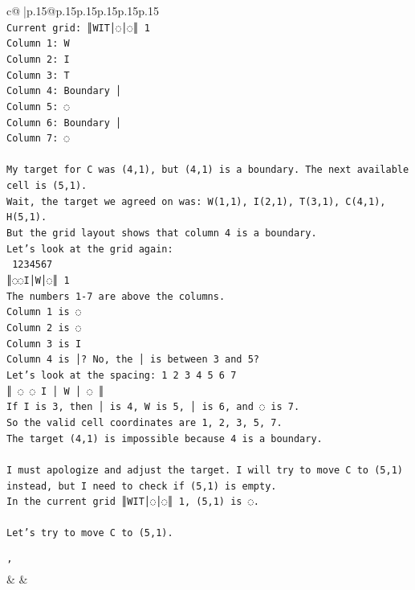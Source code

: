 \documentclass{article}
\begin{document}
{\begin{supertabular}{c@{$\;$}|p{.15\linewidth}@{}p{.15\linewidth}p{.15\linewidth}p{.15\linewidth}p{.15\linewidth}p{.15\linewidth}}
{{{\\ 
\texttt{Current grid: ║WIT│◌│◌║ 1} \\
\texttt{Column 1: W} \\
\texttt{Column 2: I} \\
\texttt{Column 3: T} \\
\texttt{Column 4: Boundary │} \\
\texttt{Column 5: ◌} \\
\texttt{Column 6: Boundary │} \\
\texttt{Column 7: ◌} \\
\\ 
\texttt{My target for C was (4,1), but (4,1) is a boundary. The next available cell is (5,1).} \\
\texttt{Wait, the target we agreed on was: W(1,1), I(2,1), T(3,1), C(4,1), H(5,1).} \\
\texttt{But the grid layout shows that column 4 is a boundary.} \\
\texttt{Let's look at the grid again:} \\
\texttt{ 1234567} \\
\texttt{║◌◌I│W│◌║ 1} \\
\texttt{The numbers 1{-}7 are above the columns.} \\
\texttt{Column 1 is ◌} \\
\texttt{Column 2 is ◌} \\
\texttt{Column 3 is I} \\
\texttt{Column 4 is │? No, the │ is between 3 and 5?} \\
\texttt{Let's look at the spacing: 1 2 3 4 5 6 7} \\
\texttt{║ ◌ ◌ I │ W │ ◌ ║} \\
\texttt{If I is 3, then │ is 4, W is 5, │ is 6, and ◌ is 7.} \\
\texttt{So the valid cell coordinates are 1, 2, 3, 5, 7.} \\
\texttt{The target (4,1) is impossible because 4 is a boundary.} \\
\\ 
\texttt{I must apologize and adjust the target. I will try to move C to (5,1) instead, but I need to check if (5,1) is empty.} \\
\texttt{In the current grid ║WIT│◌│◌║ 1, (5,1) is ◌.} \\
\\ 
\texttt{Let's try to move C to (5,1).} \\
\\ 
\texttt{'} \\
            }
        }
    }
    & & \\ \\


\end{supertabular}}
\end{document}
